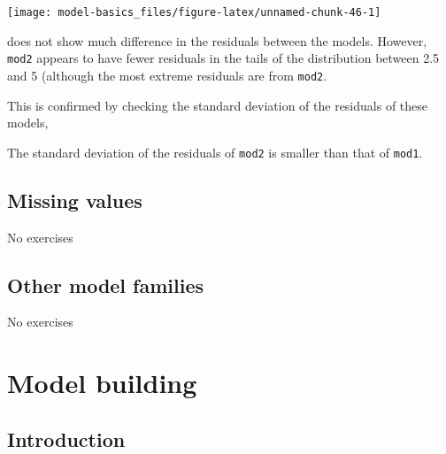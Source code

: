 \documentclass[]{book}
\newenvironment{Shaded}{\begin{snugshade}}{\end{snugshade}}
\newcommand{\CommentTok}[1]{\textcolor[rgb]{0.56,0.35,0.01}{\textit{#1}}}
\newcommand{\DataTypeTok}[1]{\textcolor[rgb]{0.13,0.29,0.53}{#1}}
\newcommand{\KeywordTok}[1]{\textcolor[rgb]{0.13,0.29,0.53}{\textbf{#1}}}
\newcommand{\NormalTok}[1]{#1}
\newcommand{\OperatorTok}[1]{\textcolor[rgb]{0.81,0.36,0.00}{\textbf{#1}}}
\newcommand{\StringTok}[1]{\textcolor[rgb]{0.31,0.60,0.02}{#1}}
\theoremstyle{plain}
\theoremstyle{remark}
\theoremstyle{definition}
\theoremstyle{definition}
\theoremstyle{definition}
\theoremstyle{remark}
\begin{document}
\begin{center}\texttt{[image: model-basics\_files/figure-latex/unnamed-chunk-46-1]} \end{center}

does not show much difference in the residuals between the models.
However, \texttt{mod2} appears to have fewer residuals in the tails of
the distribution between 2.5 and 5 (although the most extreme residuals
are from \texttt{mod2}.

This is confirmed by checking the standard deviation of the residuals of
these models,

\begin{Shaded}
\end{Shaded}

The standard deviation of the residuals of \texttt{mod2} is smaller than
that of \texttt{mod1}.

\hypertarget{missing-values-2}{%
\section{Missing values}\label{missing-values-2}}

No exercises

\hypertarget{other-model-families}{%
\section{Other model families}\label{other-model-families}}

No exercises

\hypertarget{model-building}{%
\chapter{Model building}\label{model-building}}

\hypertarget{introduction-15}{%
\section{Introduction}\label{introduction-15}}
\end{document}
